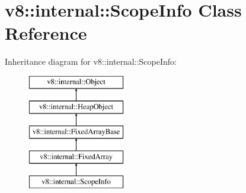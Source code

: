 \hypertarget{classv8_1_1internal_1_1_scope_info}{}\section{v8\+:\+:internal\+:\+:Scope\+Info Class Reference}
\label{classv8_1_1internal_1_1_scope_info}
Inheritance diagram for v8\+:\+:internal\+:\+:Scope\+Info\+:\begin{figure}[H]
\begin{center}
\leavevmode
\includegraphics[height=5.000000cm]{classv8_1_1internal_1_1_scope_info}
\end{center}
\end{figure}
